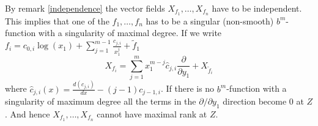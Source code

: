 \begin{remark}\label{rk:hamiltonian_vf}
By remark \ref{independence}  the vector fields $X_{f_1},\ldots, X_{f_n}$ have to be independent. This implies that one of the $f_1,\ldots, f_n$ has to be a singular (non-smooth) $b^m$-function with a singularity of maximal degree. If we write $f_i = c_{0,i}\log(x_1) + \sum_{j=1}^{m-1} \frac{c_{j,i}}{x_1^j} + \tilde{f}_1$
$$X_{f_i} = \sum_{j = 1}^{m} x_1^{m-j} \hat{c}_{j,i} \frac{\partial}{\partial y_1} +  X_{\tilde{f}_i}$$
where $\hat c_{j,i}(x) = \frac{d(c_{j,i})}{dx}-(j-1)c_{j-1,i}$. If there is no $b^m$-function with a singularity of maximum degree all the terms in the $\partial/\partial y_1$ direction become 0 at $Z$. And hence $X_{f_1},\ldots, X_{f_n}$ cannot have maximal rank at $Z$.
\end{remark}





